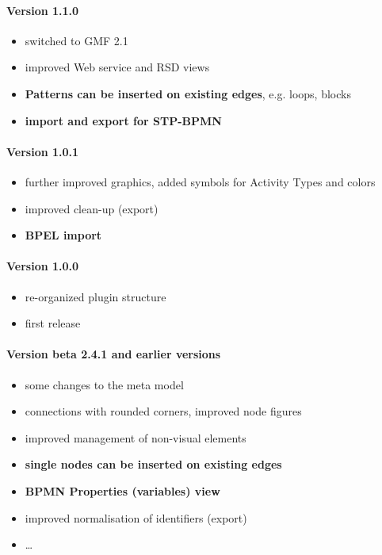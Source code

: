 \paragraph{Version 1.1.0}
\begin{itemize}
	\item switched to GMF 2.1
	\item improved Web service and RSD views
	\item \textbf{Patterns can be inserted on existing edges}, e.g. loops, blocks
	\item \textbf{import and export for STP-BPMN}
\end{itemize}

\paragraph{Version 1.0.1}
\begin{itemize}
	\item further improved graphics, added symbols for Activity Types and colors
	\item improved clean-up (export)
	\item \textbf{BPEL import}
\end{itemize}

\paragraph{Version 1.0.0}
\begin{itemize}
	\item re-organized plugin structure
	\item first release
\end{itemize}

\paragraph{Version beta 2.4.1 and earlier versions}
\begin{itemize}
	\item some changes to the meta model
	\item connections with rounded corners, improved node figures
	\item improved management of non-visual elements
	\item \textbf{single nodes can be inserted on existing edges}
	\item \textbf{BPMN Properties (variables) view}
	\item improved normalisation of identifiers (export)
	\item \dots
\end{itemize}

